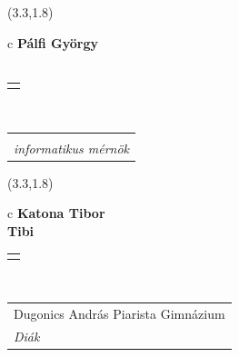 \documentclass[11pt]{article}
\begin{document}
\makebox(3.3,1.8){
  \renewcommand\arraystretch{1.3}
  \begin{tabular}[c]{c}
    \hspace{8.5mm}
    \LARGE\bf{ Pálfi György }\\
    \hspace{8.5mm}
    \Large{  }\\
    \renewcommand\arraystretch{3}
    \begin{tabular}[c]{c}
      \centering
      \fontfamily{phv}\selectfont{
        \textbf{
          \textsc{
            \scriptsize{
            \color{Dark}{ Ismerkedő }\color{Bright}{ Webmester }\color{Bright}{ Sminkmester }\color{Bright}{ Programozó }
            }
          }
        }
      }
    \end{tabular}
    \\
    \renewcommand\arraystretch{1}
    \begin{tabular}{p{3.3in}}
      \hspace{.7cm}\\
      \hspace{.7cm}\emph{ informatikus mérnök }\\
    \end{tabular}
  \end{tabular}
}

\makebox(3.3,1.8){
  \renewcommand\arraystretch{1.3}
  \begin{tabular}[c]{c}
    \hspace{8.5mm}
    \LARGE\bf{ Katona Tibor }\\
    \hspace{8.5mm}
    \Large{ Tibi }\\
    \renewcommand\arraystretch{3}
    \begin{tabular}[c]{c}
      \centering
      \fontfamily{phv}\selectfont{
        \textbf{
          \textsc{
            \scriptsize{
            \color{Bright}{ Ismerkedő }\color{Dark}{ Webmester }\color{Bright}{ Sminkmester }\color{Bright}{ Programozó }
            }
          }
        }
      }
    \end{tabular}
    \\
    \renewcommand\arraystretch{1}
    \begin{tabular}{p{3.3in}}
      \hspace{.7cm}Dugonics András Piarista Gimnázium\\
      \hspace{.7cm}\emph{ Diák }\\
    \end{tabular}
  \end{tabular}
}
\end{document}
